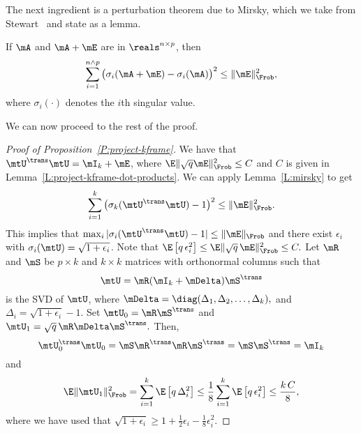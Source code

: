 The next ingredient is a perturbation theorem due to Mirsky, which we take 
from Stewart~\cite{stewart1990pts} and state as a lemma.

\begin{lemma}[Mirsky]\label{L:mirsky}
    If $\mA$ and $\mA + \mE$ are in $\reals^{n \times p}$, then
    \[
        \sum_{i=1}^{n \wedge p} 
            \big(
                \sigma_i(\mA + \mE) - \sigma_i( \mA ) 
            \big)^2 
        \leq \| \mE \|_\Frob^2,
    \]
    where $\sigma_i(\cdot)$ denotes the $i$th singular value.
\end{lemma}

We can now proceed to the rest of the proof.
\begin{proof}[Proof of Proposition~\ref{P:project-kframe}]
    We have that $\mtU^\trans \mtU = \mI_k + \mE$, 
    where $\E \| \sqrt{q} \mE \|_\Frob^2 \leq C$ and $C$ is
    given in Lemma~\ref{L:project-kframe-dot-products}.
    We can apply Lemma~\ref{L:mirsky} to get
    \[
        \sum_{i=1}^k 
            \big(
                \sigma_k(\mtU^\trans \mtU) - 1
            \big)^2 
        \leq \| \mE \|_\Frob^2.
    \]
    This implies that
    \(
        \max_i |\sigma_i( \mtU^\trans \mtU ) - 1 | \leq \| \mE \|_\Frob
    \)
    and there exist $\epsilon_i$ with 
    $\sigma_i( \mtU ) = \sqrt{1 + \epsilon_i}$.  Note that 
    \(
        \E \left[ q \, \epsilon_i^2 \right]
        \leq \E \| \sqrt{q} \, \mE \|_\Frob^2
        \leq C.
    \)
    Let $\mR$ and $\mS$ be $p \times k$ and $k \times k$ matrices
    with orthonormal columns such that
    \[
        \mtU = \mR (\mI_k + \mDelta) \mS^\trans
    \]
    is the SVD of $\mtU$, where 
    \(
        \mDelta
            = 
                \diag( 
                    \Delta_1, \Delta_2, \ldots, \Delta_k
                ),
    \)
    and $\Delta_i = \sqrt{ 1 + \epsilon_i } - 1.$  Set
    \(
        \mtU_0 = \mR \mS^\trans
    \)
    and
    \(
        \mtU_1 = \sqrt{q} \, \mR \mDelta \mS^\trans.
    \)
    Then,
    \[
        \mtU_0^\trans \mtU_0 
                = \mS \mR^\trans \mR \mS^\trans
                = \mS \mS^\trans
                = \mI_k
    \]
    and 
    \[
        \E \| \mtU_1 \|_\Frob^2 
            = \sum_{i=1}^k \E \left[ q \, \Delta_i^2 \right]
            \leq \frac{1}{8} \sum_{i=1}^k \E \left[ q \, \epsilon_i^2 \right]
            \leq \frac{k \, C}{8},
    \]
    where we have used that
    \(
        \sqrt{1 + \epsilon_i} 
            \geq 
                1 + \frac{1}{2} \epsilon_i - \frac{1}{8} \epsilon_i^2.
    \)
\end{proof}